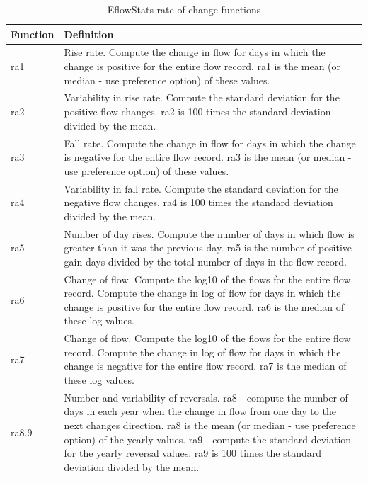 \documentclass[a4paper,11pt]{article}\usepackage[]{graphicx}\usepackage[]{color}
\begin{document}
\begin{table}[ht]
  \centering
  \begin{threeparttable}[b]
  \caption{EflowStats rate of change functions}
  \label{tab:rateStats}
\begin{tabularx}{\textwidth}{|l|X|}
  \hline
\textbf{Function} & \textbf{Definition} \\ 
  \hline
  ra1 & Rise rate. Compute the change in flow for days in which the change is positive for the entire flow record. ra1 is the mean (or median - use preference option) of these values. \\
  ra2 & Variability in rise rate. Compute the standard deviation for the positive flow changes. ra2 is 100 times the standard deviation divided by the mean. \\
  ra3 & Fall rate. Compute the change in flow for days in which the change is negative for the entire flow record. ra3 is the mean (or median - use preference option) of these values. \\
  ra4 & Variability in fall rate. Compute the standard deviation for the negative flow changes. ra4 is 100 times the standard deviation divided by the mean. \\
  ra5 & Number of day rises. Compute the number of days in which flow is greater than it was the previous day. ra5 is the number of positive-gain days divided by the total number of days in the flow record. \\
  ra6 & Change of flow. Compute the log10 of the flows for the entire flow record. Compute the change in log of flow for days in which the change is positive for the entire flow record. ra6 is the median of these log values. \\
  ra7 & Change of flow. Compute the log10 of the flows for the entire flow record. Compute the change in log of flow for days in which the change is negative for the entire flow record. ra7 is the median of these log values. \\
  ra8.9 & Number and variability of reversals. ra8 - compute the number of days in each year when the change in flow from one day to the next changes direction. ra8 is the mean (or median - use preference option) of the yearly values. ra9 - compute the standard deviation for the yearly reversal values. ra9 is 100 times the standard deviation divided by the mean. \\
   \hline
\end{tabularx}
\end{threeparttable}
\end{table}
\end{document}
